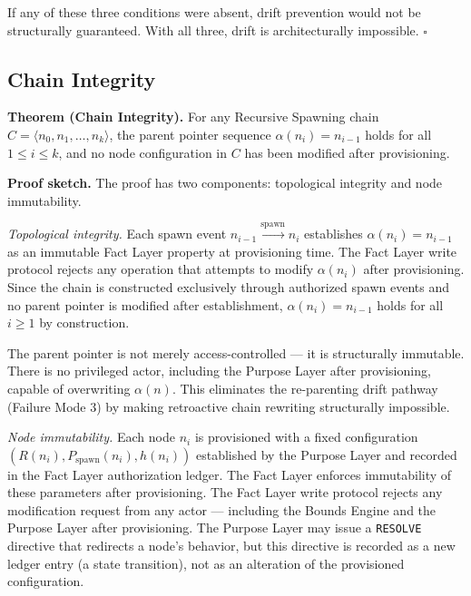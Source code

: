 If any of these three conditions were absent, drift prevention would not be structurally guaranteed. With all three, drift is architecturally impossible. $\square$

\subsection{Chain Integrity}
\label{sec:rs-chain-integrity-proof}

\medskip
\noindent\textbf{Theorem (Chain Integrity).} For any Recursive Spawning chain $C = \langle n_0, n_1, \ldots, n_k \rangle$, the parent pointer sequence $\alpha(n_i) = n_{i-1}$ holds for all $1 \leq i \leq k$, and no node configuration in $C$ has been modified after provisioning.

\medskip
\noindent\textbf{Proof sketch.} The proof has two components: topological integrity and node immutability.

\medskip
\textit{Topological integrity.} Each spawn event $n_{i-1} \xrightarrow{\text{spawn}} n_i$ establishes $\alpha(n_i) = n_{i-1}$ as an immutable Fact Layer property at provisioning time. The Fact Layer write protocol rejects any operation that attempts to modify $\alpha(n_i)$ after provisioning. Since the chain is constructed exclusively through authorized spawn events and no parent pointer is modified after establishment, $\alpha(n_i) = n_{i-1}$ holds for all $i \geq 1$ by construction.

The parent pointer is not merely access-controlled — it is structurally immutable. There is no privileged actor, including the Purpose Layer after provisioning, capable of overwriting $\alpha(n)$. This eliminates the re-parenting drift pathway (Failure Mode 3) by making retroactive chain rewriting structurally impossible.

\medskip
\textit{Node immutability.} Each node $n_i$ is provisioned with a fixed configuration $(R(n_i), P_{\text{spawn}}(n_i), h(n_i))$ established by the Purpose Layer and recorded in the Fact Layer authorization ledger. The Fact Layer enforces immutability of these parameters after provisioning. The Fact Layer write protocol rejects any modification request from any actor — including the Bounds Engine and the Purpose Layer after provisioning. The Purpose Layer may issue a \texttt{RESOLVE} directive that redirects a node's behavior, but this directive is recorded as a new ledger entry (a state transition), not as an alteration of the provisioned configuration.

